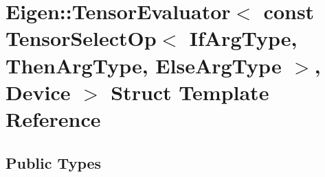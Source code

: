 \hypertarget{struct_eigen_1_1_tensor_evaluator_3_01const_01_tensor_select_op_3_01_if_arg_type_00_01_then_arg_346b931156fad56ae8aa875afe41cb55}{}\section{Eigen\+:\+:Tensor\+Evaluator$<$ const Tensor\+Select\+Op$<$ If\+Arg\+Type, Then\+Arg\+Type, Else\+Arg\+Type $>$, Device $>$ Struct Template Reference}
\label{struct_eigen_1_1_tensor_evaluator_3_01const_01_tensor_select_op_3_01_if_arg_type_00_01_then_arg_346b931156fad56ae8aa875afe41cb55}
\subsection*{Public Types}
